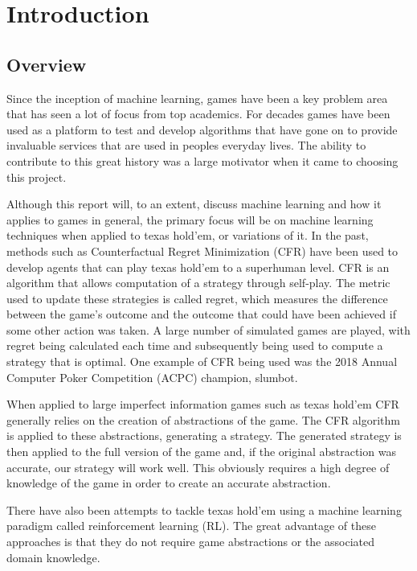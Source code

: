 \chapter{Introduction}
\label{ch:intro}

\section{Overview}\label{sec:overview}
Since the inception of machine learning, games have been a key problem area that has seen a lot of focus from
top academics.
For decades games have been used as a platform to test and develop algorithms that have gone on to provide invaluable
services that are used in peoples everyday lives.
The ability to contribute to this great history was a large motivator when it came to choosing this project.

Although this report will, to an extent, discuss machine learning and how it applies to games in general, the
primary focus will be on machine learning techniques when applied to texas hold'em, or variations of it.
In the past, methods such as Counterfactual Regret Minimization (CFR) have been used to develop agents that can
play texas hold'em to a superhuman level.
CFR is an algorithm that allows computation of a strategy through self-play.
The metric used to update these strategies is called regret, which measures the difference between the
game's outcome and the outcome that could have been achieved if some other action was taken.
A large number of simulated games are played, with regret being calculated each time and subsequently being used
to compute a strategy that is optimal.
One example of CFR being used was the 2018 Annual Computer Poker Competition (ACPC) champion, slumbot\citep{jackson2013slumbot}.

When applied to large imperfect information games such as texas hold'em CFR generally relies on the
creation of abstractions of the game.
The CFR algorithm is applied to these abstractions, generating a strategy.
The generated strategy is then applied to the full version of the game and, if the
original abstraction was accurate, our strategy will work well.
This obviously requires a high degree of knowledge of the game in order to create an accurate abstraction.

There have also been attempts to tackle texas hold'em using a machine learning paradigm called reinforcement
learning (RL).
The great advantage of these approaches is that they do not require game abstractions or the associated
domain knowledge.

